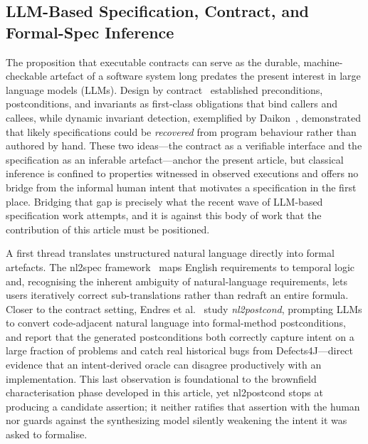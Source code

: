 \subsection{LLM-Based Specification, Contract, and Formal-Spec Inference}
\label{subsec:rw4}

The proposition that executable contracts can serve as the durable, machine-checkable artefact of a software system long predates the present interest in large language models (LLMs). Design by contract~\cite{meyer1992dbc} established preconditions, postconditions, and invariants as first-class obligations that bind callers and callees, while dynamic invariant detection, exemplified by Daikon~\cite{ernst2007daikon}, demonstrated that likely specifications could be \emph{recovered} from program behaviour rather than authored by hand. These two ideas---the contract as a verifiable interface and the specification as an inferable artefact---anchor the present article, but classical inference is confined to properties witnessed in observed executions and offers no bridge from the informal human intent that motivates a specification in the first place. Bridging that gap is precisely what the recent wave of LLM-based specification work attempts, and it is against this body of work that the contribution of this article must be positioned.

A first thread translates unstructured natural language directly into formal artefacts. The nl2spec framework~\cite{cosler2023nl2spec} maps English requirements to temporal logic and, recognising the inherent ambiguity of natural-language requirements, lets users iteratively correct sub-translations rather than redraft an entire formula. Closer to the contract setting, Endres et al.~\cite{endres2024nl2postcond} study \emph{nl2postcond}, prompting LLMs to convert code-adjacent natural language into formal-method postconditions, and report that the generated postconditions both correctly capture intent on a large fraction of problems and catch real historical bugs from Defects4J---direct evidence that an intent-derived oracle can disagree productively with an implementation. This last observation is foundational to the brownfield characterisation phase developed in this article, yet nl2postcond stops at producing a candidate assertion; it neither ratifies that assertion with the human nor guards against the synthesizing model silently weakening the intent it was asked to formalise.

